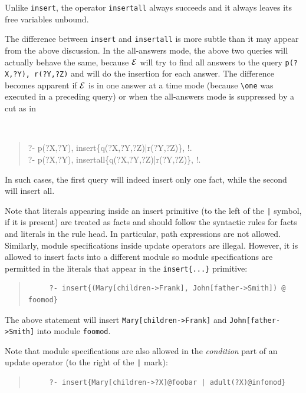 \documentclass[11pt]{article}
\newcommand{\ERGO}{\mbox{\ensuremath{\cal{E}}\smaller{{\sc{RGO}}}}\xspace}
\newcommand{\FLSYSTEM}{\ERGO}
\newcommand{\bs}{\textbackslash}
\begin{document}
Unlike {\tt insert}, the operator {\tt insertall} always succeeds and it
always leaves its free variables unbound.

The difference between {\tt insert} and {\tt insertall} is more subtle than
it may appear from the above discussion. In the all-answers mode, the above
two queries will actually behave the same, because \FLSYSTEM will try to find
all answers to the query {\tt p(?X,?Y), r(?Y,?Z)} and will do the 
insertion for each answer. The difference becomes apparent if \FLSYSTEM is in
one answer at a time mode (because {\tt \bs{}one} was executed in a preceding
query) or when the all-answers mode is suppressed by a cut as in
{\tt
\begin{quote}
       ?- p(?X,?Y), insert\{q(?X,?Y,?Z)|r(?Y,?Z)\}, !.\\ 
       ?- p(?X,?Y), insertall\{q(?X,?Y,?Z)|r(?Y,?Z)\}, !.
\end{quote}
}
\noindent
In such cases, the first query will indeed insert only one fact, while the
second will insert all.

Note that literals appearing inside an insert primitive (to the left of the
\verb'|' symbol, if it is present) are treated as
facts and should follow the syntactic rules for facts and literals in the
rule head. In particular, path expressions are not allowed.
Similarly, module specifications inside update operators are illegal.
However, it is allowed to insert facts into a different module so module
specifications are permitted in the literals that appear in the 
{\tt insert\{...\}} primitive:
\begin{quote}
\begin{verbatim}
     ?- insert{(Mary[children->Frank], John[father->Smith]) @ foomod}
\end{verbatim}
\end{quote}
The above statement will insert {\tt Mary[children->Frank]} and
{\tt John[father->Smith]} into module {\tt foomod}.

Note that module specifications are also allowed in the
\emph{condition} part of an update operator (to the right of the \verb'|'
mark):
\begin{quote}
\begin{verbatim}
     ?- insert{Mary[children->?X]@foobar | adult(?X)@infomod}
\end{verbatim}
\end{quote}
\end{document}
